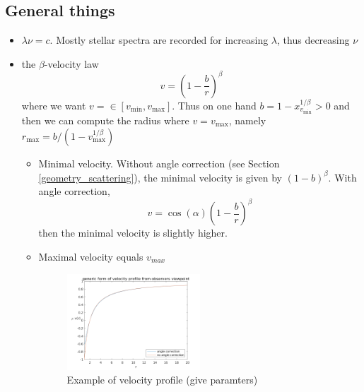 \documentclass[../main/main.tex]{subfiles}
\begin{document}
\subsection{General things}
\begin{itemize}
\item $\lambda \nu = c$. Mostly stellar spectra are recorded for increasing $\lambda$, thus decreasing $\nu$

\item the $\beta$-velocity law
\begin{equation}
v = \left( 1-\frac{b}{r} \right)^{\beta}
\end{equation}
where we want $v = \in [v_{\text{min}} , v_{\text{max}}]$. Thus on one hand $b = 1-x_{v_{\text{min}}}^{1/\beta} >0$ and then we can compute the radius where $v = v_{\text{max}}$, namely $r_{\text{max}} = b/(1-v_{\text{max}}^{1/\beta})$

\begin{itemize}
\item Minimal velocity. Without angle correction (see Section \ref{geometry_scattering}), the minimal velocity is given by $(1-b)^{\beta}$. With angle correction,
\begin{equation}
v = \cos(\alpha) \left( 1-\frac{b}{r} \right)^{\beta}
\end{equation}
then the minimal velocity is slightly higher.

\item Maximal velocity equals $v_{max}$

\begin{figure}[!htp]
\centering
\includegraphics[width=0.5\textwidth]{../../two_resonance_lines/figures/velocity_profile.png}
\caption{Example of velocity profile (give paramters)}
\label{example_velocity_profile}
\end{figure}

\end{itemize}
\end{itemize}



\newpage
\end{document}
